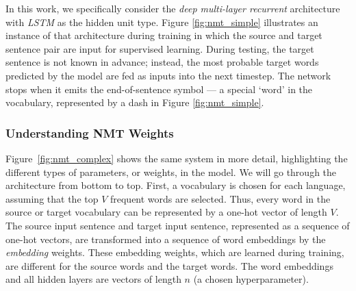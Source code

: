 %
%

In this work, we specifically consider the {\it deep multi-layer recurrent} architecture with {\it
LSTM} as the hidden unit type.
Figure \ref{fig:nmt_simple} illustrates an instance of that architecture during training in which the source and target sentence pair are input for supervised
learning. During testing, the target sentence is not known in advance; instead, the most probable
target words predicted by the model are fed as inputs into the next timestep.
The network stops when it emits the end-of-sentence symbol --- a special `word' in the vocabulary, represented by a dash in Figure \ref{fig:nmt_simple}.


\subsubsection{Understanding NMT Weights}
\label{subsubsec:lstm}
Figure~\ref{fig:nmt_complex} shows the same system in more detail,
highlighting the different types of parameters, or weights, in the model.
We will go through the architecture from bottom to top.
First, a vocabulary is chosen for each language, assuming that the top $V$ frequent
words are selected.
Thus, every word in the source or target vocabulary can be represented by a one-hot vector of length $V$.
The source input sentence and target input sentence, represented as a sequence
of one-hot vectors, are transformed into a sequence of word embeddings by the
\emph{embedding} weights. 
These embedding weights, which are learned during training, are different for the source words and the target words.
The word embeddings and all hidden layers are vectors of length $n$ (a chosen hyperparameter).

